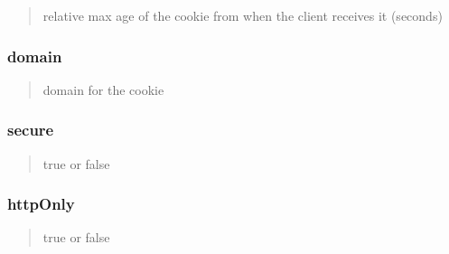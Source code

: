 \begin{quote}
relative max age of the cookie from when the client receives it (seconds) \end{quote}


\subsubsection*{domain}

\begin{quote}
domain for the cookie \end{quote}


\subsubsection*{secure}

\begin{quote}
true or false \end{quote}


\subsubsection*{http\+Only}

\begin{quote}
true or false\end{quote}
